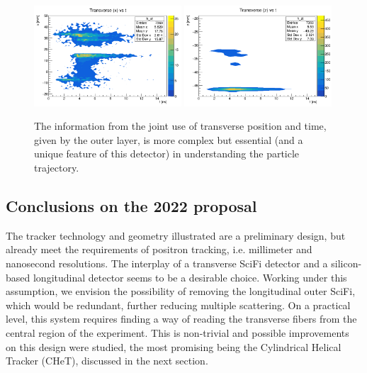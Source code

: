 \begin{refsection}
        \begin{figure}
            \centering
            \includegraphics[width=0.49\textwidth]{Figures/muEDM/Tracker/fPosInXfTimeIn.png}
            \includegraphics[width=0.49\textwidth]{Figures/muEDM/Tracker/fPosInZfTimeIn.png}
            \caption[muEDM tracker \gf: combined information]{The information from the joint use of transverse position and time, given by the outer layer, is more complex but essential (and a unique feature of this detector) in understanding the particle trajectory.}
        \label{fig:geant4_time_pos_transverse}
        \end{figure}

    \subsection{Conclusions on the 2022 proposal}
        The tracker technology and geometry illustrated are a preliminary design, but already meet the requirements of positron tracking, i.e. millimeter and nanosecond resolutions. 
        The interplay of a transverse SciFi detector and a silicon-based longitudinal detector seems to be a desirable choice. 
        Working under this assumption, we envision the possibility of removing the longitudinal outer SciFi, which would be redundant, further reducing multiple scattering. 
        On a practical level, this system requires finding a way of reading the transverse fibers from the central region of the experiment.
        This is non-trivial and possible improvements on this design were studied, the most promising being the Cylindrical Helical Tracker (CHeT), discussed in the next section.
        

\end{refsection}
